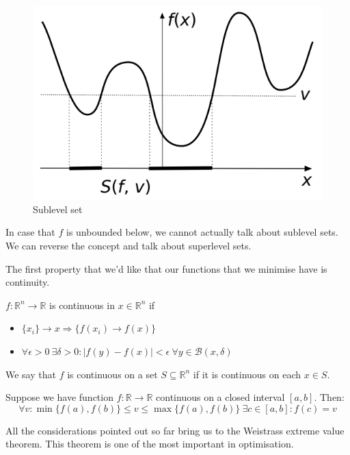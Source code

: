 \begin{figure}
    \centering
    \includegraphics[scale=0.4]{figures/1/4-sublevelsets.png}
    \caption{Sublevel set}
    \label{fig:sublevelsets}
\end{figure}
\par In case that $f$ is unbounded below, we cannot actually talk about sublevel sets. We can reverse the concept and talk about superlevel sets.
%
\par The first property that we'd like that our functions that we minimise have is continuity.
\begin{definition}
    $f:\mathbb{R}^n \rightarrow \mathbb{R}$ is continuous in $x \in \mathbb{R}^n$ if
    \begin{itemize}
        \item $\{x_i\} \rightarrow x \Rightarrow \{f(x_i) \rightarrow f(x)\}$
        \item $\forall \epsilon > 0\ \exists \delta > 0 : |f(y) - f(x)| < \epsilon\ \forall y \in \mathcal{B}(x,\delta)$
    \end{itemize}
\end{definition}
We say that $f$ is continuous on a set $S \subseteq \mathbb{R}^n$ if it is continuous on each $x \in S$.
\begin{theorem}
    Suppose we have function $f : \mathbb{R} \rightarrow \mathbb{R}$ continuous on a closed interval $[a,b]$. Then:
    \[
        \forall v : \min \{f(a),f(b)\} \leq v \leq \max \{f(a),f(b)\}\ \exists c \in [a,b] : f(c) = v
    \]
\end{theorem}
All the considerations pointed out so far bring us to the Weistrass extreme value theorem. This theorem is one of the most important in optimisation.

